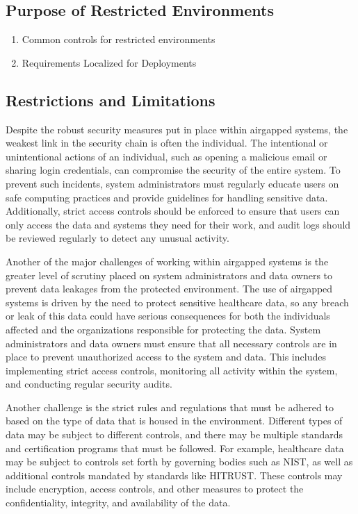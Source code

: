 \documentclass{amia}
\begin{document}
\subsection{Purpose of Restricted Environments}

\begin{enumerate}
	\item Common controls for restricted environments
	\item Requirements Localized for Deployments
\end{enumerate}

\subsection{Restrictions and Limitations}

Despite the robust security measures put in place within airgapped systems, the weakest link in the security chain is often the individual. The intentional or unintentional actions of an individual, such as opening a malicious email or sharing login credentials, can compromise the security of the entire system. To prevent such incidents, system administrators must regularly educate users on safe computing practices and provide guidelines for handling sensitive data. Additionally, strict access controls should be enforced to ensure that users can only access the data and systems they need for their work, and audit logs should be reviewed regularly to detect any unusual activity.

Another of the major challenges of working within airgapped systems is the greater level of scrutiny placed on system administrators and data owners to prevent data leakages from the protected environment. The use of airgapped systems is driven by the need to protect sensitive healthcare data, so any breach or leak of this data could have serious consequences for both the individuals affected and the organizations responsible for protecting the data. System administrators and data owners must ensure that all necessary controls are in place to prevent unauthorized access to the system and data. This includes implementing strict access controls, monitoring all activity within the system, and conducting regular security audits.

Another challenge is the strict rules and regulations that must be adhered to based on the type of data that is housed in the environment. Different types of data may be subject to different controls, and there may be multiple standards and certification programs that must be followed. For example, healthcare data may be subject to controls set forth by governing bodies such as NIST, as well as additional controls mandated by standards like HITRUST. These controls may include encryption, access controls, and other measures to protect the confidentiality, integrity, and availability of the data.
\end{document}
